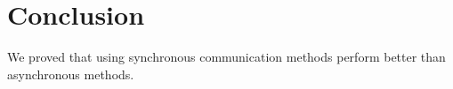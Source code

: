 \documentclass[conference]{IEEEtran}
\begin{document}
%
%
%
%
%
%
\section{Conclusion}
We proved that using synchronous communication methods perform better than asynchronous methods. 
\end{document}
